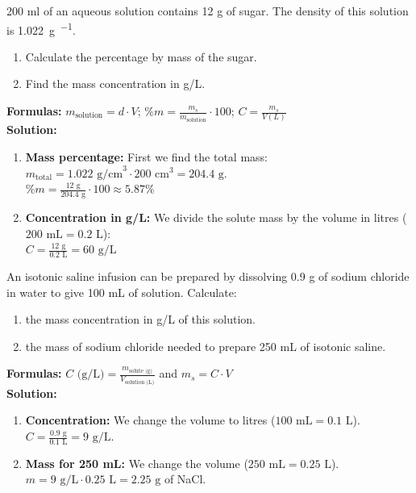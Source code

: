 \begin{exercise}
    200 ml of an aqueous solution contains 12 g of sugar. The density of this solution is \qty{1.022}{\g\per\cmcubicos}.
    \begin{enumerate}[label=\letraminuscula]
        \item Calculate the percentage by mass of the sugar.
        \item Find the mass concentration in g/L.
    \end{enumerate}
    \begin{solu}
        \textbf{Formulas:} $m_{\text{solution}} = d \cdot V$; $\%m = \frac{m_s}{m_{\text{solution}}} \cdot 100$; $C = \frac{m_s}{V(L)}$ \\
        \textbf{Solution:}
        \begin{enumerate}[label=\alph*)]
        \item \textbf{Mass percentage:}
        First we find the total mass: $m_{\text{total}} = 1.022 \text{ g/cm}^3 \cdot 200 \text{ cm}^3 = 204.4 \text{ g}$. \\
        $\%m = \frac{12 \text{ g}}{204.4 \text{ g}} \cdot 100 \approx 5.87\%$
        \item \textbf{Concentration in g/L:}
        We divide the solute mass by the volume in litres ($200 \text{ mL} = 0.2 \text{ L}$): \\
        $C = \frac{12 \text{ g}}{0.2 \text{ L}} = 60 \text{ g/L}$
        \end{enumerate}
    \end{solu}
\end{exercise}

\begin{exercise}
    An isotonic saline infusion can be prepared by dissolving 0.9 g of sodium chloride in water to give 100 mL of solution.
    Calculate:
    \begin{enumerate}[label=\letraminuscula]
            \item the mass concentration in g/L of this solution.
            \item the mass of sodium chloride needed to prepare 250 mL of isotonic saline.
    \end{enumerate}
    \begin{solu}
        \textbf{Formulas:} $C \text{ (g/L)} = \frac{m_{\text{solute (g)}}}{V_{\text{solution (L)}}}$ and $m_s = C \cdot V$ \\
        \textbf{Solution:}
        \begin{enumerate}[label=\alph*)]
                \item \textbf{Concentration:} We change the volume to litres ($100 \text{ mL} = 0.1 \text{ L}$). \\
                $C = \frac{0.9 \text{ g}}{0.1 \text{ L}} = 9 \text{ g/L}$.
                \item \textbf{Mass for 250 mL:} We change the volume ($250 \text{ mL} = 0.25 \text{ L}$). \\
                $m = 9 \text{ g/L} \cdot 0.25 \text{ L} = 2.25 \text{ g}$ of NaCl.
        \end{enumerate}
    \end{solu}
\end{exercise}


